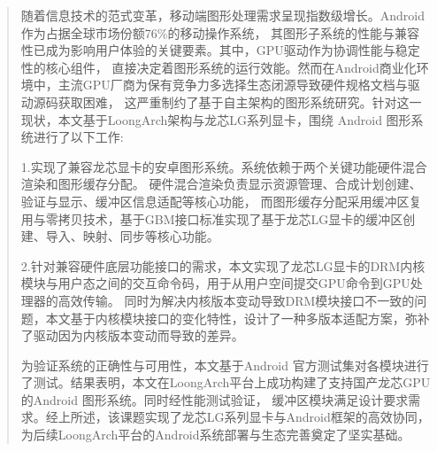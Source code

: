
\begin{abstract}
  随着信息技术的范式变革，移动端图形处理需求呈现指数级增长。Android作为占据全球市场份额76\%的移动操作系统，
  其图形子系统的性能与兼容性已成为影响用户体验的关键要素。其中，GPU驱动作为协调性能与稳定性的核心组件，
  直接决定着图形系统的运行效能。然而在Android商业化环境中，主流GPU厂商为保有竞争力多选择生态闭源导致硬件规格文档与驱动源码获取困难，
  这严重制约了基于自主架构的图形系统研究。针对这一现状，本文基于LoongArch架构与龙芯LG系列显卡，围绕 Android 图形系统进行了以下工作:
  
  1.实现了兼容龙芯显卡的安卓图形系统。系统依赖于两个关键功能硬件混合渲染和图形缓存分配。
  硬件混合渲染负责显示资源管理、合成计划创建、验证与显示、缓冲区信息适配等核心功能，
  而图形缓存分配采用缓冲区复用与零拷贝技术，基于GBM接口标准实现了基于龙芯LG显卡的缓冲区创建、导入、映射、同步等核心功能。

  2.针对兼容硬件底层功能接口的需求，本文实现了龙芯LG显卡的DRM内核模块与用户态之间的交互命令码，用于从用户空间提交GPU命令到GPU处理器的高效传输。
  同时为解决内核版本变动导致DRM模块接口不一致的问题，本文基于内核模块接口的变化特性，设计了一种多版本适配方案，弥补了驱动因为内核版本变动而导致的差异。

  为验证系统的正确性与可用性，本文基于Android 官方测试集对各模块进行了测试。结果表明，本文在LoongArch平台上成功构建了支持国产龙芯GPU的Android 图形系统。同时经性能测试验证，
  缓冲区模块满足设计要求需求。经上所述，该课题实现了龙芯LG系列显卡与Android框架的高效协同，为后续LoongArch平台的Android系统部署与生态完善奠定了坚实基础。



  
\end{abstract}

